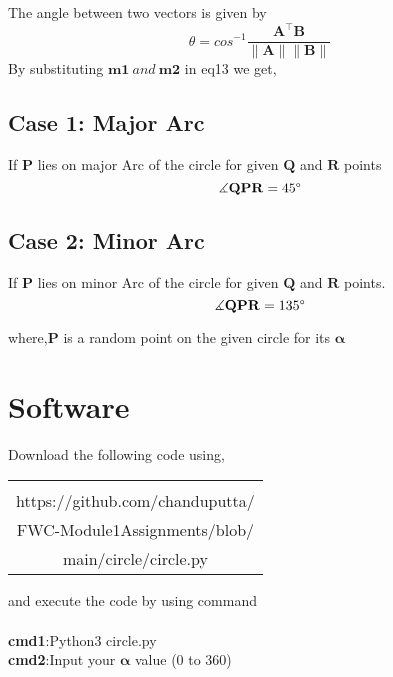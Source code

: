 \documentclass[journal,12pt,twocolumn]{article}
\let\vec\mathbf
\let\vec\mathbf
\begin{document}
The angle between two vectors is given by
\begin{equation}
\theta = {cos}^{-1}\frac{\vec{A^{\top}} \vec{B}}{\vec{\|A\| \|B\|}}
   \label{eq-14}
\end{equation}
By substituting $\vec{m1} \:and\: \vec{m2} $  in eq13 we get,

\subsection{Case 1: Major Arc} If $\vec{P}$ lies on major Arc of the circle for given $\vec{Q}$ and $\vec{R}$ points
\begin{equation}
 \vec{\measuredangle{QPR}} = 45\degree
  \label{eq-14}
\end{equation}



\subsection{Case 2: Minor Arc} If $\vec{P}$ lies on minor Arc of the circle for given $\vec{Q}$ and $\vec{R}$ points.
\begin{equation}
 \vec{\measuredangle{QPR}} = 135\degree
  \label{eq-15}
\end{equation}


where,$ \vec{P} $ is a random point on the given circle for its $\boldsymbol{\alpha}$\\
 
 
\section{Software}
Download the following code using,
{\setlength\extrarowheight{2pt}
\begin{table}[h]
    \centering
    \begin{tabular}{|c|}
    \hline \\
         https://github.com/chanduputta/\\FWC-Module1Assignments/blob/\\main/circle/circle.py  \\       
\hline
    \end{tabular}
\end{table}
}
and execute the code by using command\\\\
\centering
\textbf{cmd1}:Python3  circle.py\\
\textbf{cmd2}:Input your $\boldsymbol{\alpha}$ value (0 to 360\degree)
\end{document}
